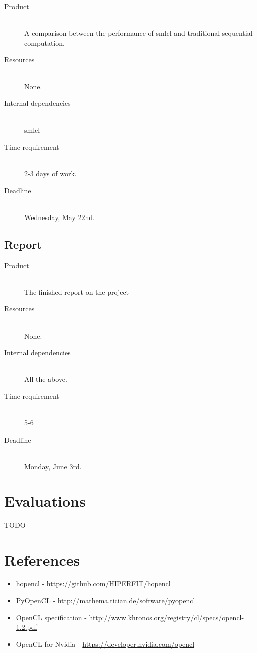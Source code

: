 \documentclass[a4paper, 10pt]{article}
\begin{document}
\begin{description}
  \item[Product] \hfill \\ A comparison between the performance of
    smlcl and traditional sequential computation.
  \item[Resources] \hfill \\
    None.
  \item[Internal dependencies] \hfill \\
    smlcl
  \item[Time requirement] \hfill \\
    2-3 days of work.
  \item[Deadline] \hfill \\
    Wednesday, May 22nd.
\end{description}


\subsection{Report}

\begin{description}
  \item[Product] \hfill \\ The finished report on the project
  \item[Resources] \hfill \\
    None.
  \item[Internal dependencies] \hfill \\
    All the above.
  \item[Time requirement] \hfill \\
    5-6
  \item[Deadline] \hfill \\
    Monday, June 3rd.
\end{description}

\section{Evaluations}

TODO

\section{References}

\begin{itemize}
  \item hopencl - \url{https://github.com/HIPERFIT/hopencl} \\
  \item PyOpenCL - \url{http://mathema.tician.de/software/pyopencl} \\
  \item OpenCL specification -
    \url{http://www.khronos.org/registry/cl/specs/opencl-1.2.pdf} \\
  \item OpenCL for Nvidia - \url{https://developer.nvidia.com/opencl}
    \\
\end{itemize}
\end{document}
